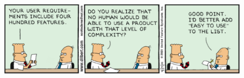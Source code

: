 \documentclass{../../slides-style}
\begin{document}
    \begin{frame}
        \begin{center}
            \includegraphics[width=0.95\textwidth]{dilbert.png}
        \end{center}
    \end{frame}
\end{document}
